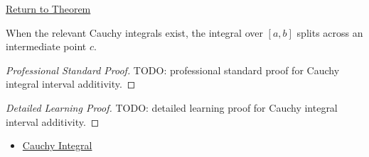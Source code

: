 \newpage
{}
\label{prf:cauchy-integral-interval-additivity}

\begin{remark*}[Return]
\hyperref[thm:cauchy-integral-interval-additivity]{Return to Theorem}
\end{remark*}

\begin{theorem*}
When the relevant Cauchy integrals exist, the integral over \([a,b]\) splits
across an intermediate point \(c\).
\end{theorem*}

\begin{proof}[Professional Standard Proof]
\LRAProofBodyStart
TODO: professional standard proof for Cauchy integral interval additivity.
\end{proof}

\begin{proof}[Detailed Learning Proof]
\LRAProofBodyStart
TODO: detailed learning proof for Cauchy integral interval additivity.
\end{proof}

\begin{remark*}
\end{remark*}

\begin{dependencies}
\begin{itemize}
  \item \hyperref[def:cauchy-integral]{Cauchy Integral}
\end{itemize}
\end{dependencies}

\clearpage
